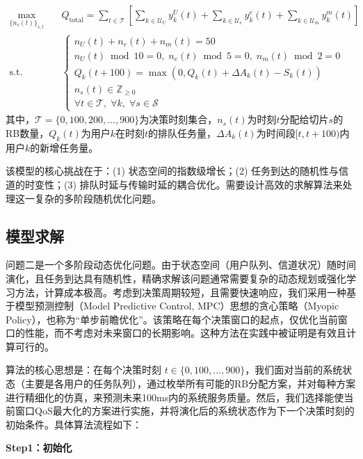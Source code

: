 \begin{equation}
\begin{aligned}
\max_{\{n_s(t)\}_{s,t}} \quad & Q_{\text{total}} = \sum_{t \in \mathcal{T}} \left[ \sum_{k \in \mathcal{U}_U} y_{k}^{U}(t) + \sum_{k \in \mathcal{U}_e} y_{k}^{e}(t) + \sum_{k \in \mathcal{U}_m} y_{k}^{m}(t) \right]\\
\text{s.t.} \quad & \begin{cases}
 n_U(t) + n_e(t) + n_m(t) = 50\\
 n_U(t) \bmod 10 = 0,\; n_e(t) \bmod 5 = 0,\; n_m(t) \bmod 2 = 0\\
 Q_k(t+100) = \max\!\left(0, Q_k(t) + \Delta A_k(t) - S_k(t)\right) \\
 n_s(t) \in \mathbb{Z}_{\ge 0}\\
 \forall t \in \mathcal{T},\; \forall k,\; \forall s \in \mathcal{S}
 \end{cases}
 \end{aligned}
 \end{equation}
其中，$\mathcal{T} = \{0, 100, 200, \ldots, 900\}$为决策时刻集合，$n_s(t)$为时刻$t$分配给切片$s$的RB数量，$Q_k(t)$为用户$k$在时刻$t$的排队任务量，$\Delta A_k(t)$为时间段$[t, t+100)$内用户$k$的新增任务量。

该模型的核心挑战在于：(1) 状态空间的指数级增长；(2) 任务到达的随机性与信道的时变性；(3) 排队时延与传输时延的耦合优化。需要设计高效的求解算法来处理这一复杂的多阶段随机优化问题。

\subsection{模型求解}

问题二是一个多阶段动态优化问题。由于状态空间（用户队列、信道状况）随时间演化，且任务到达具有随机性，精确求解该问题通常需要复杂的动态规划或强化学习方法，计算成本极高。考虑到决策周期较短，且需要快速响应，我们采用一种基于模型预测控制（Model Predictive Control, MPC）思想的贪心策略（Myopic Policy），也称为“单步前瞻优化”。该策略在每个决策窗口的起点，仅优化当前窗口的性能，而不考虑对未来窗口的长期影响。这种方法在实践中被证明是有效且计算可行的。

算法的核心思想是：在每个决策时刻 $t \in \{0, 100, \dots, 900\}$，我们面对当前的系统状态（主要是各用户的任务队列），通过枚举所有可能的RB分配方案，并对每种方案进行精细化的仿真，来预测未来100ms内的系统服务质量。然后，我们选择能使当前窗口QoS最大化的方案进行实施，并将演化后的系统状态作为下一个决策时刻的初始条件。具体算法流程如下：

\textbf{Step1：初始化}

